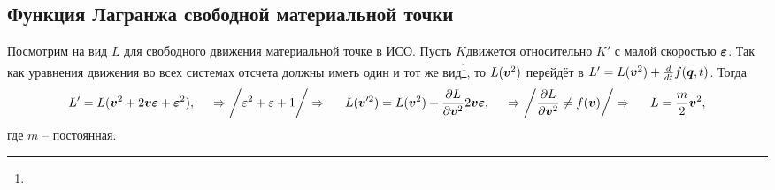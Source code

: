 \subsection{Функция Лагранжа свободной материальной точки}


Посмотрим на вид $L$ для свободного движения материальной точке в ИСО. Пусть $K$движется относительно $K'$ с малой скоростью $\mbox{\boldmath $\varepsilon$}$. Так как уравнения движения во всех системах отсчета должны иметь один и тот же вид\footnote{
}, то $L(\mbox{\boldmath $v$}^2)$ перейдёт в $L' = L(\mbox{\boldmath $v$}^2) + \frac{d}{dt} f(\mbox{\boldmath $q$}, t)$.
Тогда 
$$
    L' = L(\mbox{\boldmath $v$}^2 + 2 \mbox{\boldmath $v$} \mbox{\boldmath $\varepsilon$} + \mbox{\boldmath $\varepsilon$}^2), 
    \hspace{0.5cm} \Rightarrow  \bigg/
    \varepsilon^2 + \varepsilon + 1
    \bigg/ \Rightarrow \hspace{0.5cm} 
    L(\mbox{\boldmath $v$}'^2) = L(\mbox{\boldmath $v$}^2) + \frac{\partial L}{\partial \mbox{\boldmath $v$}^2} 2 \mbox{\boldmath $v$} \mbox{\boldmath $\varepsilon$},
    \hspace{0.5cm} \Rightarrow  \bigg/
    \frac{\partial L}{\partial \mbox{\boldmath $v$}^2} \neq f(\mbox{\boldmath $v$})
    \bigg/ \Rightarrow \hspace{0.5cm} L = \frac{m}{2} \mbox{\boldmath $v$}^2,
$$
где $m$ -- постоянная.
 
